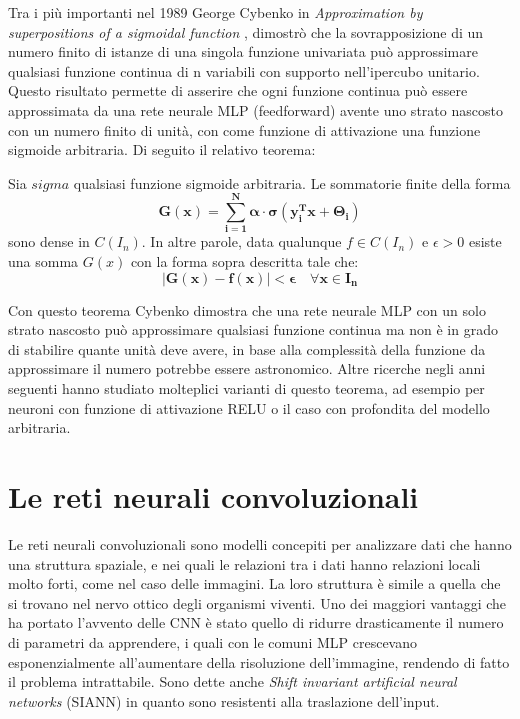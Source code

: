 Tra i più importanti nel 1989 George Cybenko in \textit{Approximation by superpositions of a sigmoidal function} \cite{cybenko1989approximation},
dimostrò che la sovrapposizione di un numero finito di istanze di una singola funzione univariata può approssimare qualsiasi funzione continua 
di n variabili con supporto nell'ipercubo unitario. Questo risultato permette di asserire che ogni funzione continua può essere approssimata da 
una rete neurale MLP (feedforward) avente uno strato nascosto con un numero finito di unità, con come funzione di attivazione una funzione sigmoide arbitraria.
Di seguito il relativo teorema:
\begin{theorem}
    \label{thm:cybenko_1}
    Sia $sigma$ qualsiasi funzione sigmoide arbitraria. Le sommatorie finite della forma
    \begin{equation}
        \mathbf{G(x) = \sum_{i=1}^{N} \alpha \cdot \sigma(y_i^Tx + \Theta_i)}
    \end{equation}
    sono dense in $C(I_n)$. In altre parole, data qualunque $f \in C(I_n)$ e $\epsilon > 0$ esiste una somma $G(x)$
    con la forma sopra descritta tale che:
    \begin{equation}
        \mathbf{|G(x) - f(x)| < \epsilon \quad \forall x \in I_n}
    \end{equation}
\end{theorem}

Con questo teorema Cybenko dimostra che una rete neurale MLP con un solo strato nascosto può approssimare qualsiasi funzione continua
ma non è in grado di stabilire quante unità deve avere,  in base alla complessità della funzione da approssimare il numero potrebbe essere astronomico.
Altre ricerche negli anni seguenti hanno studiato molteplici varianti di questo teorema, ad esempio per neuroni con funzione di attivazione RELU 
o il caso con profondita del modello arbitraria.

\section{Le reti neurali convoluzionali}

Le reti neurali convoluzionali sono modelli concepiti per analizzare dati che hanno una struttura spaziale,
e nei quali le relazioni tra i dati hanno relazioni locali molto forti, come nel caso delle immagini.
La loro struttura è simile a quella che si trovano nel nervo ottico degli organismi viventi.
Uno dei maggiori vantaggi che ha portato l'avvento delle CNN è stato quello di ridurre drasticamente il numero di parametri da apprendere,
i quali con le comuni MLP crescevano esponenzialmente all'aumentare della risoluzione dell'immagine, rendendo di fatto il problema
intrattabile. 
Sono dette anche \textit{Shift invariant artificial neural networks} (SIANN) in quanto sono resistenti alla traslazione dell'input.

